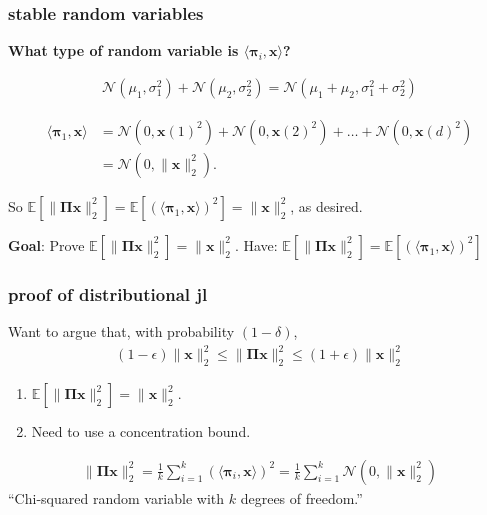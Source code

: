 \documentclass[compress]{beamer}
\newcommand{\bs}[1]{\boldsymbol{#1}}
\newcommand{\bv}[1]{\mathbf{#1}}
\newcommand{\E}{\mathbb{E}}
\begin{document}
\begin{frame}[t]
	\frametitle{stable random variables}
	\textbf{What type of random variable is $\langle\bs{\pi}_i,\bv{x}\rangle$?}
	\begin{fact}
		\begin{align*}
			\mathcal{N}(\mu_1, \sigma_1^2) + \mathcal{N}(\mu_2, \sigma_2^2) =  \mathcal{N}(\mu_1 + \mu_2, \sigma_1^2 + \sigma_2^2)
		\end{align*}
	\end{fact}
\vspace{-1.5em}

	\begin{align*}
		\langle\bs{\pi}_1,\bv{x}\rangle &= \mathcal{N}(0,\bv{x}(1)^2) + \mathcal{N}(0,\bv{x}(2)^2) + \ldots + \mathcal{N}(0,\bv{x}(d)^2) \\ &= \mathcal{N}(0,\|\bv{x}\|_2^2). 
	\end{align*}
	
	So $\E \left[\|\bs{\Pi} \bv{x} \|_2^2\right] = \E\left[\left(\langle\bs{\pi}_1,\bv{x}\rangle\right)^2 \right] = \|\bv{x}\|_2^2$, as desired.
	
		\vspace{2em}
	\begin{block}{\vspace*{-3ex}}
		\small \textbf{Goal}: Prove $\E \left[\|\bs{\Pi} \bv{x} \|_2^2\right] = \|\bv{x}\|_2^2$. Have: $\E \left[\|\bs{\Pi} \bv{x} \|_2^2\right] = \E\left[\left(\langle\bs{\pi}_1,\bv{x}\rangle\right)^2 \right]$
	\end{block}
\end{frame}

\begin{frame}
	\frametitle{proof of distributional jl}
	Want to argue that, with probability $(1-\delta)$,
	\begin{align*}
		(1-\epsilon)\|\bv{x}\|_2^2 \leq \|\bs{\Pi}\bv{x}\|_2^2 \leq (1+\epsilon)\|\bv{x}\|_2^2 
	\end{align*}
	
	\begin{enumerate}
		\item $\E \left[\|\bs{\Pi} \bv{x} \|_2^2\right] = \|\bv{x}\|_2^2$.
		\item Need to use a concentration bound.
	\end{enumerate}
	\begin{align*}
		\|\bs{\Pi} \bv{x} \|_2^2 = \frac{1}{k}\sum_{i=1}^k \left(\langle\bs{\pi}_i,\bv{x}\rangle\right)^2 = \frac{1}{k}\sum_{i=1}^k \mathcal{N}(0,\|\bv{x}\|_2^2)
	\end{align*}
	\alert{``Chi-squared random variable with $k$ degrees of freedom.''}
\end{frame}
\end{document}
